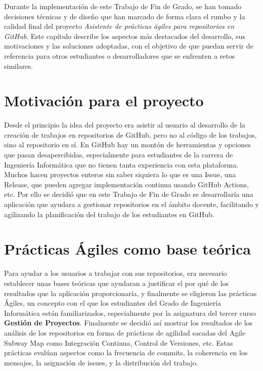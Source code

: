 
Durante la implementación de este Trabajo de Fin de Grado, se han tomado decisiones técnicas y de diseño que han marcado de forma clara el rumbo y la calidad final del proyecto \textit{Asistente de prácticas ágiles para repositorios en GitHub}. Este capítulo describe los aspectos más destacados del desarrollo, sus motivaciones y las soluciones adoptadas, con el objetivo de que puedan servir de referencia para otros estudiantes o desarrolladores que se enfrenten a retos similares.

\section{Motivación para el proyecto}
Desde el principio la idea del proyecto era asistir al usuario al desarrollo de la creación de trabajos en repositorios de GitHub, pero no al código de los trabajos, sino al repositorio en sí. En GitHub hay un montón de herramientas y opciones que pasan desapercibidas, especialmente para estudiantes de la carrera de Ingeniería Informática que no tienen tanta experiencia con esta plataforma. Muchos hacen proyectos enteros sin saber siquiera lo que es una Issue, una Release, que pueden agregar implementación continua usando GitHub Actions, etc. Por ello se decidió que en este Trabajo de Fin de Grado se desarrollaría una aplicación que ayudara a gestionar repositorios en el ámbito docente, facilitando y agilizando la planificación del trabajo de los estudiantes en GitHub.

\section{Prácticas Ágiles como base teórica}

Para ayudar a los usuarios a trabajar con sus repositorios, era necesario establecer unas bases teóricas que ayudaran a justificar el por qué de los resultados que la aplicación proporcionaría, y finalmente se eligieron las prácticas Ágiles, un concepto con el que los estudiantes del Grado de Ingeniería Informática están familiarizados, especialmente por la asignatura del tercer curso \textbf{Gestión de Proyectos}. Finalmente se decidió así mostrar los resultados de los análisis de los repositorios en forma de prácticas de agilidad sacadas del Agile Subway Map \cite{agileSubwayMap} como Integración Continua, Control de Versiones, etc. Estas prácticas evalúan aspectos como la frecuencia de commits, la coherencia en los mensajes, la asignación de issues, y la distribución del trabajo.

